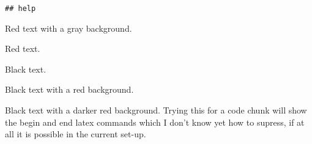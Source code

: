 \documentclass[]{article}
\begin{document}
\begin{verbatim}
## help
\end{verbatim}

\begin{shaded}

Red text with a gray background.

\end{shaded}

Red text.

\color{black}

Black text.


\begin{shaded}

Black text with a red background.

\end{shaded}


\begin{shaded}

Black text with a darker red background. Trying this for a code chunk
will show the begin and end latex commands which I don't know yet how
to supress, if at all it is possible in the current set-up.

\end{shaded}
\end{document}
